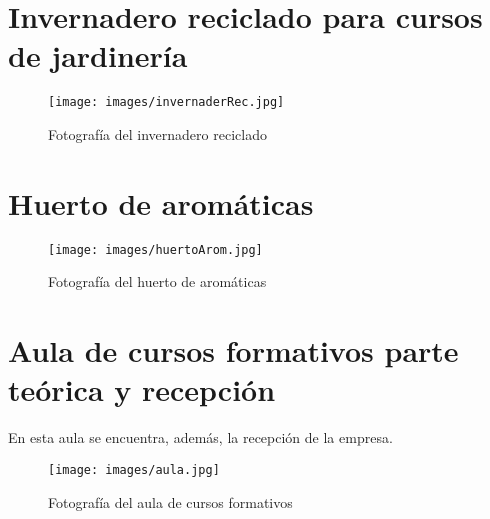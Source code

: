 \newpage
\section{Invernadero reciclado para  cursos de jardinería}
\label{sec:invReciclado}

\begin{figure}[h]
  \begin{center}
    \texttt{[image: images/invernaderRec.jpg]}
    \caption{Fotografía del invernadero reciclado}
    \label{fig:invernaderRec}
  \end{center}
\end{figure}

\section{Huerto de  aromáticas}
\label{sec:aromaticas}

\begin{figure}[h]
  \begin{center}
    \texttt{[image: images/huertoArom.jpg]}
    \caption{Fotografía del huerto de aromáticas}
    \label{fig:huertoArom}
  \end{center}
\end{figure}

\newpage
\section{Aula de cursos formativos parte teórica y recepción}
\label{sec:aula}

En esta aula se encuentra, además, la recepción de la empresa.

\begin{figure}[h]
  \begin{center}
    \texttt{[image: images/aula.jpg]}
    \caption{Fotografía del aula de cursos formativos}
    \label{fig:aula}
  \end{center}
\end{figure}


 
